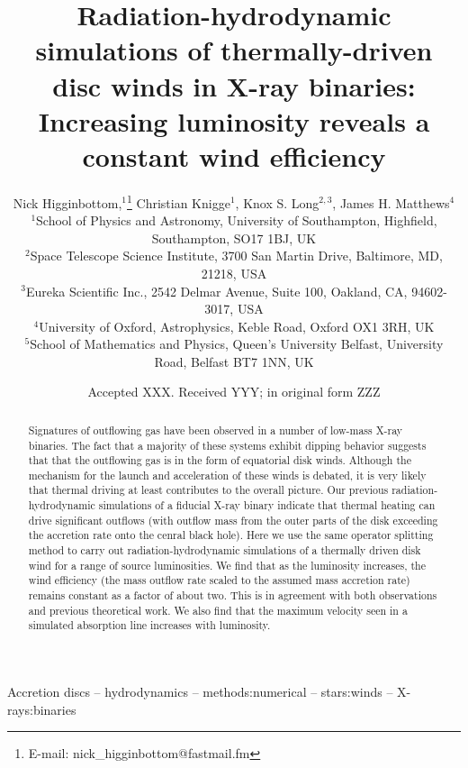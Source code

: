 \documentclass[a4paper,fleqn,usenatbib]{mnras}
\title[Increasing luminosity]{Radiation-hydrodynamic simulations of thermally-driven disc winds in X-ray binaries: Increasing
luminosity reveals a constant wind efficiency}
\author[N. Higginbottom et. al]
{Nick Higginbottom,$^{1}$\thanks{E-mail: nick\_higginbottom@fastmail.fm}
Christian Knigge$^{1}$, Knox S. Long$^{2,3}$, 
James H. Matthews$^{4}$ \newauthor{and
Edward J. Parkinson$^{1}$.}
\\
$^{1}$School of Physics and Astronomy, University of Southampton, Highfield, Southampton, SO17 1BJ, UK\\
$^{2}$Space Telescope Science Institute, 3700 San Martin Drive, Baltimore, MD, 21218, USA\\
$^{3}$Eureka Scientific Inc., 2542 Delmar Avenue, Suite 100, Oakland, CA, 94602-3017, USA\\
$^{4}$University of Oxford, Astrophysics, Keble Road, Oxford OX1 3RH, UK\\
$^{5}$School of Mathematics and Physics, Queen's University Belfast, University Road, Belfast 
BT7 1NN, UK\\
}
\date{Accepted XXX. Received YYY; in original form ZZZ}
\begin{document}
\label{firstpage}
\pagerange{\pageref{firstpage}--\pageref{lastpage}}
\maketitle

\begin{abstract}

Signatures of outflowing gas have been observed in a number of low-mass X-ray binaries. The fact that a majority of these systems exhibit dipping behavior suggests that 
that the outflowing gas is in the form 
of equatorial disk winds. Although the mechanism for the launch and acceleration of these winds is debated, it is very likely
that thermal driving at least contributes to the overall picture. Our previous radiation-hydrodynamic simulations of a fiducial X-ray binary indicate that thermal heating can drive significant outflows (with outflow mass from the outer parts of the disk exceeding the accretion rate onto the cenral black hole).
Here we use the same operator splitting method to carry out radiation-hydrodynamic simulations of a thermally driven 
disk wind for a range of source luminosities. We find that as the luminosity increases, the wind efficiency (the mass outflow
rate scaled to the assumed mass accretion rate) remains constant as a factor of about two. This is in agreement
with both observations and previous theoretical work. We also find that the maximum velocity seen in a simulated 
absorption line increases with luminosity. 



\end{abstract}

\begin{keywords}
Accretion discs -- hydrodynamics -- methods:numerical -- stars:winds -- X-rays:binaries
\end{keywords}


\end{document}
